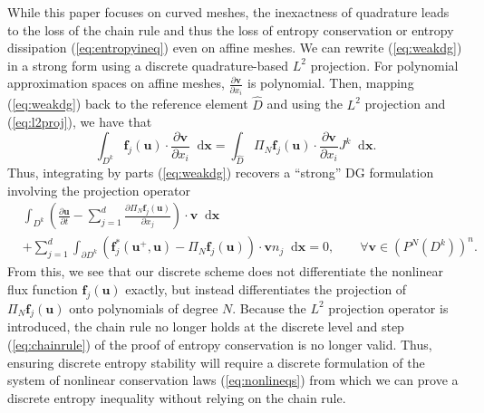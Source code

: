 \documentclass[10pt]{amsart}
\theoremstyle{definition}
\theoremstyle{lemma}
\theoremstyle{theorem}
\theoremstyle{assumption}
\renewcommand{\hat}{\widehat}
\newcommand{\pd}[2]{\frac{\partial#1}{\partial#2}}
\newcommand{\LRp}[1]{\left( #1 \right)}
\newcommand*\diff[1]{\mathop{}\!{\mathrm{d}#1}} %
\begin{document}
While this paper focuses on curved meshes, the inexactness of quadrature leads to the loss of the chain rule and thus the loss of entropy conservation or entropy dissipation (\ref{eq:entropyineq}) even on affine meshes.  We can rewrite (\ref{eq:weakdg}) in a strong form using a discrete quadrature-based $L^2$ projection.  For polynomial approximation spaces on affine meshes, $\pd{\bm{v}}{x_i}$ is polynomial.  
Then, mapping (\ref{eq:weakdg}) back to the reference element $\hat{D}$ and using the $L^2$ projection and (\ref{eq:l2proj}), we have that
\[
\int_{D^k} \bm{f}_j(\bm{u}) \cdot \pd{\bm{v}}{x_i} \diff{\bm{x}} = \int_{\hat{D}} \Pi_N \bm{f}_j(\bm{u}) \cdot \pd{\bm{v}}{x_i} J^k\diff{\bm{x}}.
\]
Thus, integrating by parts (\ref{eq:weakdg}) recovers a ``strong'' DG formulation involving the projection operator
\begin{align}
&\int_{D^k} \LRp{\pd{\bm{u}}{t} - \sum_{j=1}^d \pd{\Pi_N \bm{f}_j(\bm{u})}{x_j}} \cdot \bm{v} \diff{\bm{x}} \nonumber\\
&+ \sum_{j=1}^d \int_{\partial D^k} \LRp{\bm{f}^*_j\LRp{\bm{u}^+,\bm{u}} - \Pi_N\bm{f}_j(\bm{u})}\cdot \bm{v} n_j  \diff{\bm{x}} = 0, \qquad \forall \bm{v}\in \LRp{P^N\LRp{D^k}}^n.  
\label{eq:strongdg}
\end{align}
From this, we see that our discrete scheme does not differentiate the nonlinear flux function $\bm{f}_j\LRp{\bm{u}}$ exactly, but instead differentiates the projection of $\Pi_N \bm{f}_j\LRp{\bm{u}}$ onto polynomials of degree $N$.  Because the $L^2$ projection operator is introduced, the chain rule no longer holds at the discrete level and step (\ref{eq:chainrule}) of the proof of entropy conservation is no longer valid.  Thus, ensuring discrete entropy stability will require a discrete formulation of the system of nonlinear conservation laws (\ref{eq:nonlineqs}) from which we can prove a discrete entropy inequality without relying on the chain rule.  

\end{document}
